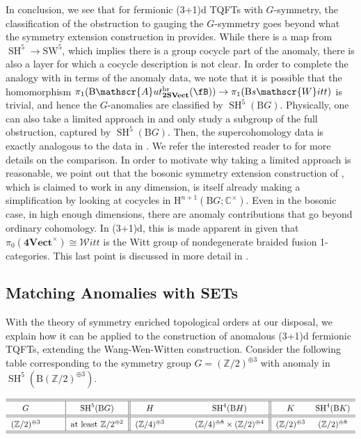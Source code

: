 \documentclass[11pt,reqno]{amsart}
\DeclareMathOperator{\br}{br}
\newcommand{\Z}{\mathbb{Z}}
\DeclareMathOperator{\SH}{SH}
\newcommand{\sWitt}{s\mathscr{W}itt}
\newcommand{\Witt}{\mathcal{W}itt}
\newcommand{\tSVect}{\mathbf{2SVect}}
\newcommand{\sAut}{\mathscr{A}ut}
\newcommand{\rH}{\mathrm{H}}
\newcommand{\rB}{\mathrm{B}}
\numberwithin{equation}{section}
\theoremstyle{plain}
\theoremstyle{definition}
\begin{document}
 In conclusion, we see that for fermionic (3+1)d TQFTs with $G$-symmetry, the classification of the obstruction to gauging the $G$-symmetry goes beyond what the symmetry extension construction in \cite{Wang:2017loc} provides. While there is a map from $\SH^5 \to \mathrm{SW}^5$, which implies there is a group cocycle part of the anomaly, there is also a layer for which a cocycle description is not clear. In order to complete the analogy with \cite{Wang:2017loc} in terms of the anomaly data, we note that it is possible that the homomorphism $\pi_1( \rB \sAut^{\br}_{\tSVect}(\fB)) \rightarrow \pi_1 (\rB \sWitt)$ is trivial, and hence the $G$-anomalies are classified by $\SH^5(\rB G)$. Physically, one can also take a limited approach in   and only study a subgroup of the full obstruction, captured by $\SH^5(\rB G)$.  Then, the supercohomology data is exactly analogous to the data in . We refer the interested reader to \cite[Appendix A]{DYY1} for more details on the comparison. 
 In order to motivate why taking a limited approach is reasonable, we point out that the bosonic symmetry extension construction of \cite{Wang:2017loc}, which is claimed to work in any dimension, is itself already making a simplification by looking at cocycles in $\rH^{n+1}(\rB G; \mathbb{C}^\times)$. Even in the bosonic case, in high enough dimensions, there are anomaly contributions that go beyond ordinary cohomology. In (3+1)d, this is made apparent in  given that $\pi_0(\mathbf{4Vect}^{\times})\cong\Witt$ is the Witt group of nondegenerate braided fusion 1-categories. This last point is discussed in more detail in \cite[Section 3.3]{JF2}.

\subsection{Matching Anomalies with SETs}
With the theory of symmetry enriched topological orders at our disposal, we explain how it can be applied to the construction of anomalous (3+1)d fermionic TQFTs, extending the Wang-Wen-Witten construction. Consider the following table corresponding to the symmetry group $G = (\Z/2)^{\oplus 3}$ with anomaly in $\SH^5(\rB (\Z/2)^{\oplus 3})$. 

\begin{equation}
\renewcommand{\arraystretch}{1.4}
\begin{tabular}%
{c c c | c|| c c c  c|| cc }
\hline \hline %
 $G$ &  &  & $\SH^{5}(\rB G)$ & $H$ &  &  & $\SH^4(\rB H)$ & $K$ & $\SH^4(\rB K)$ \\ \hline\hline 
 {$(\Z/2)^{\oplus 3}$} &  &  & $\text{at least}$ $\Z/2^{\oplus 2}$ & $(\Z/4)^{\oplus 3}$ & & & $(\Z/4)^{\oplus 8}\times (\Z/2)^{\oplus 4}$ & $(\Z/2)^{\oplus 3}$& $(\Z/2)^{\oplus 8}$ \\ \hline
\hline%
\end{tabular}
\end{equation}
\end{document}
